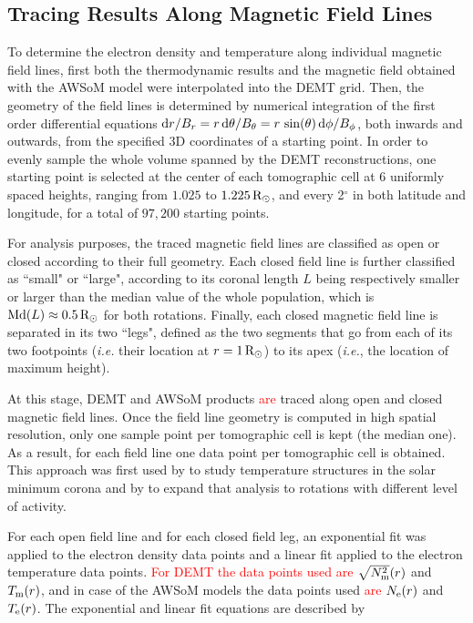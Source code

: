 \documentclass[namedreferences]{solarphysics}
\def\edit#1{\textcolor{Red}{#1}}
\newcommand{\mrsun}{{\rm R_\odot}}
\newcommand{\Te}{T_{\rm e}}
\newcommand{\Tm}{T_{\rm m}}
\newcommand{\Ne}{N_{\rm e}}
\newcommand{\Nsqm}{N^2_{{\rm m}}}
\newcommand{\sqravgN}{\sqrt{\Nsqm}}
\begin{document}
\begin{article}
\subsection{{Tracing Results Along Magnetic Field Lines}}\label{trace} 

{To determine} the electron density and temperature along individual magnetic field lines, first both the thermodynamic results and the magnetic field obtained with the AWSoM model were interpolated into the DEMT grid. Then, the geometry of the field lines is determined by numerical integration of the first order differential equations  ${\rm d}r/B_r = {r\,{\rm d}\theta}/B_\theta = r\,\sin(\theta)\,{\rm d}\phi/B_\phi$, both inwards and outwards, from the specified 3D coordinates of a starting point. In order to evenly sample the whole volume spanned by the DEMT reconstructions, one starting point is selected at the center of each tomographic cell at 6 uniformly spaced heights, ranging from $1.025$ to $1.225\,\mrsun$, and every 2$^\circ$ in both latitude and longitude, {for a total of $97,200$ starting points.}

{For analysis purposes, {the traced magnetic field lines are classified as open or closed according to their full geometry. Each closed field} line is further classified as ``small" or ``large", according to its coronal length $L$ being {respectively smaller or larger than the median value of the whole population, which is ${\rm Md}(L)\approx 0.5\,\mrsun$ for both rotations.} Finally, each closed magnetic field line is separated in its two ``legs", defined as the two segments that go from each of its two footpoints (\textit{i.e.} their location at $r=1\,\mrsun$) to its apex (\textit{i.e.}, the location of maximum height).}

At this {stage, DEMT and AWSoM products} \edit{are} traced along open and closed magnetic field lines. Once the field line geometry is computed in high spatial resolution, only one sample point per tomographic cell is kept (the median one). As a result, for each field line one data point per tomographic cell {is obtained. This approach} was first used by \citet{huang_2012} to {study temperature} structures in the solar minimum {corona and by} \citet{nuevo_2013} to expand that analysis to rotations with different level of activity.

For each open field line and {for each closed field leg}, an exponential fit {was applied} to the electron density {data points} and a linear fit applied to the electron temperature {data points}. \edit{For DEMT the data points used are} $\sqravgN(r)$ and $\Tm(r)$, and in case of {the AWSoM models} the data points used \edit{are} $\Ne(r)$ and $\Te(r)$. The exponential and linear fit equations are described by


\end{article}
\end{document}
